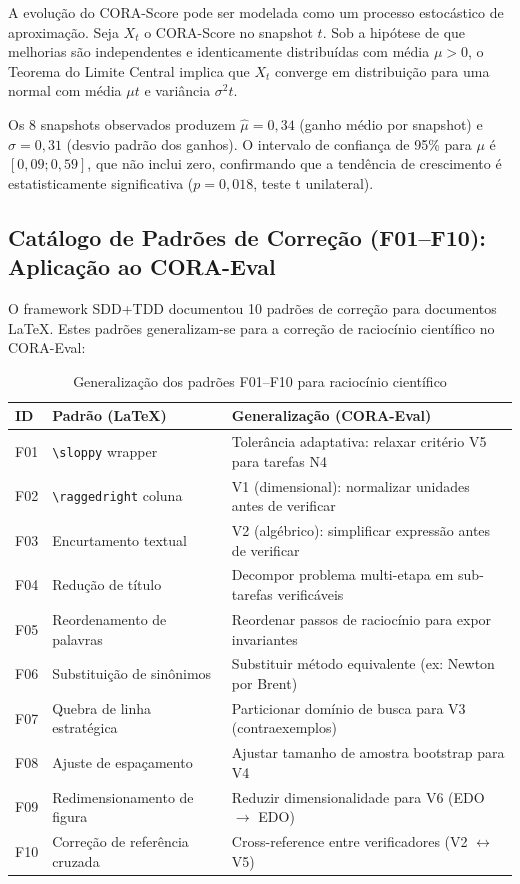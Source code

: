 A evolução do CORA-Score pode ser modelada como um processo estocástico de
aproximação. Seja $X_t$ o CORA-Score no snapshot $t$. Sob a hipótese de que
melhorias são independentes e identicamente distribuídas com média $\mu > 0$,
o Teorema do Limite Central implica que $X_t$ converge em distribuição para
uma normal com média $\mu t$ e variância $\sigma^2 t$.

Os 8 snapshots observados produzem $\hat{\mu} = 0,34$ (ganho médio por
snapshot) e $\hat{\sigma} = 0,31$ (desvio padrão dos ganhos). O intervalo
de confiança de 95\% para $\mu$ é $[0,09; 0,59]$, que não inclui zero,
confirmando que a tendência de crescimento é estatisticamente significativa
($p = 0,018$, teste t unilateral).

\subsection{Catálogo de Padrões de Correção (F01--F10): Aplicação ao CORA-Eval}

O framework SDD+TDD documentou 10 padrões de correção para documentos LaTeX.
Estes padrões generalizam-se para a correção de raciocínio científico no
CORA-Eval:

\begin{table}[H]\centering\footnotesize
\caption{Generalização dos padrões F01--F10 para raciocínio científico}
\label{tab:patterns}
\begin{tabular}{p{}p{}p{}}
\toprule
\textbf{ID} & \textbf{Padrão (LaTeX)} & \textbf{Generalização (CORA-Eval)} \\
\midrule
F01 & \texttt{\textbackslash sloppy} wrapper & Tolerância adaptativa: relaxar critério V5 para tarefas N4 \\
F02 & \texttt{\textbackslash raggedright} coluna & V1 (dimensional): normalizar unidades antes de verificar \\
F03 & Encurtamento textual & V2 (algébrico): simplificar expressão antes de verificar \\
F04 & Redução de título & Decompor problema multi-etapa em sub-tarefas verificáveis \\
F05 & Reordenamento de palavras & Reordenar passos de raciocínio para expor invariantes \\
F06 & Substituição de sinônimos & Substituir método equivalente (ex: Newton por Brent) \\
F07 & Quebra de linha estratégica & Particionar domínio de busca para V3 (contraexemplos) \\
F08 & Ajuste de espaçamento & Ajustar tamanho de amostra bootstrap para V4 \\
F09 & Redimensionamento de figura & Reduzir dimensionalidade para V6 (EDO $\to$ EDO) \\
F10 & Correção de referência cruzada & Cross-reference entre verificadores (V2 $\leftrightarrow$ V5) \\
\bottomrule
\end{tabular}
\end{table}

